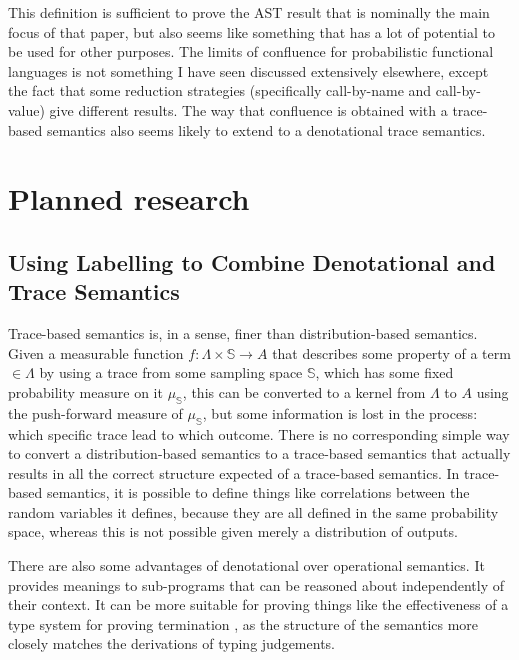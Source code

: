 \documentclass[titlepage]{article}
\begin{document}
This definition is sufficient to prove the AST result that is nominally the main focus of that paper, but also seems like something that has a lot of potential to be used for other purposes. The limits of confluence for probabilistic functional languages is not something I have seen discussed extensively elsewhere, except the fact that some reduction strategies (specifically call-by-name and call-by-value) give different results. The way that confluence is obtained with a trace-based semantics also seems likely to extend to a denotational trace semantics.


\section{Planned research}
\subsection{Using Labelling to Combine Denotational and Trace Semantics}
Trace-based semantics is, in a sense, finer than distribution-based semantics. Given a measurable function $f : \Lambda \times \mathbb S \to A$ that describes some property of a term $\in \Lambda$ by using a trace from some sampling space $\mathbb S$, which has some fixed probability measure on it $\mu_{\mathbb S}$, this can be converted to a kernel from $\Lambda$ to $A$ using the push-forward measure of $\mu_{\mathbb S}$, but some information is lost in the process: which specific trace lead to which outcome. There is no corresponding simple way to convert a distribution-based semantics to a trace-based semantics that actually results in all the correct structure expected of a trace-based semantics. In trace-based semantics, it is possible to define things like correlations between the random variables it defines, because they are all defined in the same probability space, whereas this is not possible given merely a distribution of outputs.

There are also some advantages of denotational over operational semantics. It provides meanings to sub-programs that can be reasoned about independently of their context. It can be more suitable for proving things like the effectiveness of a type system for proving termination , as the structure of the semantics more closely matches the derivations of typing judgements.%
\end{document}
